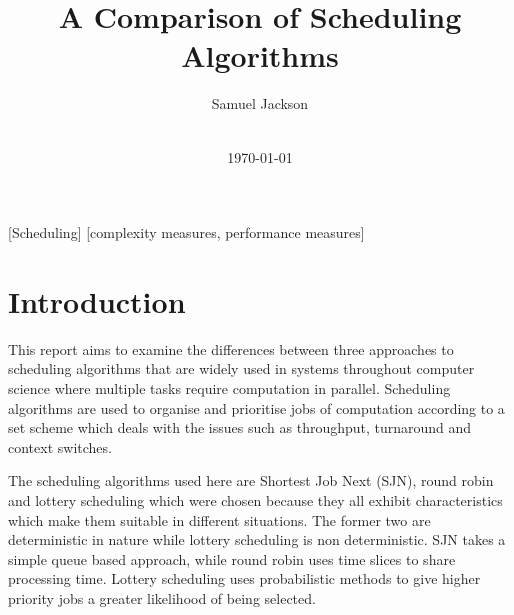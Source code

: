 \documentclass{acm_proc_article-sp}
\begin{document}
\title{A Comparison of Scheduling Algorithms}
\author{
\alignauthor
Samuel Jackson\\
       \\
}
\date{\today}

\maketitle
\begin{abstract}

\end{abstract}

[Scheduling]
[complexity measures, performance measures]



\section{Introduction}
This report aims to examine the differences between three approaches to scheduling algorithms that are widely used in systems throughout computer science where multiple tasks require computation in parallel. Scheduling algorithms are used to organise and prioritise jobs of computation according to a set scheme which deals with the issues such as throughput, turnaround and context switches.

The scheduling algorithms used here are Shortest Job Next (SJN), round robin and lottery scheduling which were chosen because they all exhibit characteristics which make them suitable in different situations. The former two are deterministic in nature while lottery scheduling is non deterministic. SJN takes a simple queue based approach, while round robin uses time slices to share processing time. Lottery scheduling uses probabilistic methods to give higher priority jobs a greater likelihood of being selected.
\end{document}
